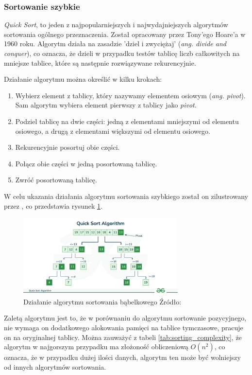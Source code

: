 \subsubsection*{Sortowanie szybkie}
\textit{Quick Sort}, to jeden z najpopularniejszych i najwydajniejszych algorytmów sortowania ogólnego przeznaczenia. Został opracowany przez Tony'ego Hoare'a w 1960 roku. Algorytm działa na zasadzie 'dziel i zwyciężaj' (\textit{ang. divide and conquer}), co oznacza, że dzieli w przypadku testów tablicę liczb całkowitych na mniejsze tablice, które są następnie rozwiązywane rekurencyjnie.

Działanie algorytmu można określić w kilku krokach:
\begin{enumerate}
  \item Wybierz element z tablicy, który nazywamy elementem osiowym (\textit{ang. pivot}). Sam algorytm wybiera element pierwszy z tablicy jako \textit{pivot}.
  \item Podziel tablicę na dwie części: jedną z elementami mniejszymi od elementu osiowego, a drugą z elementami większymi od elementu osiowego.
  \item Rekurencyjnie posortuj obie części.
  \item Połącz obie części w jedną posortowaną tablicę.
  \item Zwróć posortowaną tablicę.
\end{enumerate}

W celu ukazania działania algorytmu sortowania szybkiego został on zilustrowany przez \cite{quick_sort}, co przedstawia rysunek \ref{fig:quick_sort}.

\begin{figure}[H]
  \centering
  \includegraphics[width=0.75\textwidth]{Figures/quick_sort.png}
  \caption{Działanie algorytmu sortowania bąbelkowego Źródło: \cite{quick_sort}}
  \label{fig:quick_sort}
\end{figure}

Zaletą algorytmu jest to, że w porównaniu do algorytmu sortowanie pozycyjnego, nie wymaga on dodatkowego alokowania pamięci na tablice tymczasowe, pracuje on na oryginalnej tablicy. Można zauważyć z tabeli \ref{tab:sorting_complexity}, że algorytm w najgorszym przypadku ma złożoność obliczeniową $O(n^2)$, co oznacza, że w przypadku dużej ilości danych, algorytm ten może być wolniejszy od innych algorytmów sortowania.

